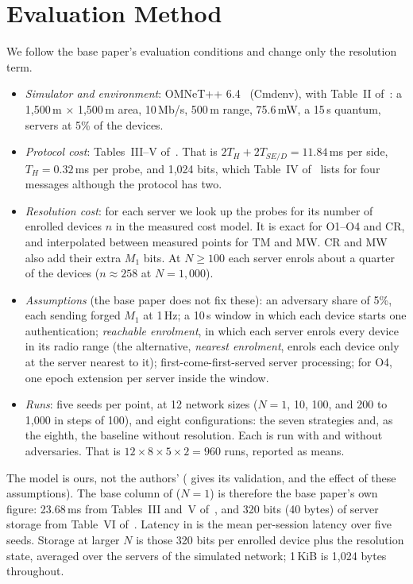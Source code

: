 \section{Evaluation Method}\label{sec:method}
We follow the base paper's evaluation conditions and change only the resolution term.
\begin{itemize}
\item \emph{Simulator and environment}: OMNeT++ 6.4~\cite{omnet} (Cmdenv), with Table~II of~\cite{base}: a
1{,}500\,m $\times$ 1{,}500\,m area, 10\,Mb/s, 500\,m range, 75.6\,mW, a 15\,\textmu s quantum, servers at 5\% of the devices.
\item \emph{Protocol cost}: Tables~III--V of~\cite{base}. That is $2T_H+2T_{SE/D}=11.84$\,ms per side, $T_H=0.32$\,ms per
probe, and 1{,}024 bits, which Table~IV of~\cite{base} lists for four messages although the protocol has two.
\item \emph{Resolution cost}: for each server we look up the probes for its number of enrolled devices $n$ in the
measured cost model. It is exact for O1--O4 and CR, and interpolated between measured points for TM and MW. CR and MW
also add their extra $M_1$ bits. At $N\ge100$ each server enrols about a quarter of the devices ($n\approx258$ at
$N=1{,}000$).
\item \emph{Assumptions} (the base paper does not fix these): an adversary share of 5\%, each sending forged $M_1$ at
1\,Hz; a 10\,s window in which each device starts one authentication; \emph{reachable enrolment}, in which each server
enrols every device in its radio range (the alternative, \emph{nearest enrolment}, enrols each device only at the server
nearest to it); first-come-first-served server processing; for O4, one epoch extension per server inside the window.
\item \emph{Runs}: five seeds per point, at 12 network sizes ($N=1$, 10, 100, and 200 to 1{,}000 in steps of 100), and eight
configurations: the seven strategies and, as the eighth, the baseline without resolution. Each is run with and without
adversaries. That is $12\times8\times5\times2=960$ runs, reported as means.
\end{itemize}

The model is ours, not the authors' ( gives its validation, and  the effect of
these assumptions). The base column of  ($N=1$) is therefore the base paper's own figure: 23.68\,ms from
Tables~III and~V of~\cite{base}, and 320 bits (40 bytes) of server storage from Table~VI of~\cite{base}. Latency in 
is the mean per-session latency over five seeds. Storage at larger $N$ is those 320 bits per enrolled device plus the
resolution state, averaged over the servers of the simulated network; 1\,KiB is 1{,}024 bytes throughout.

